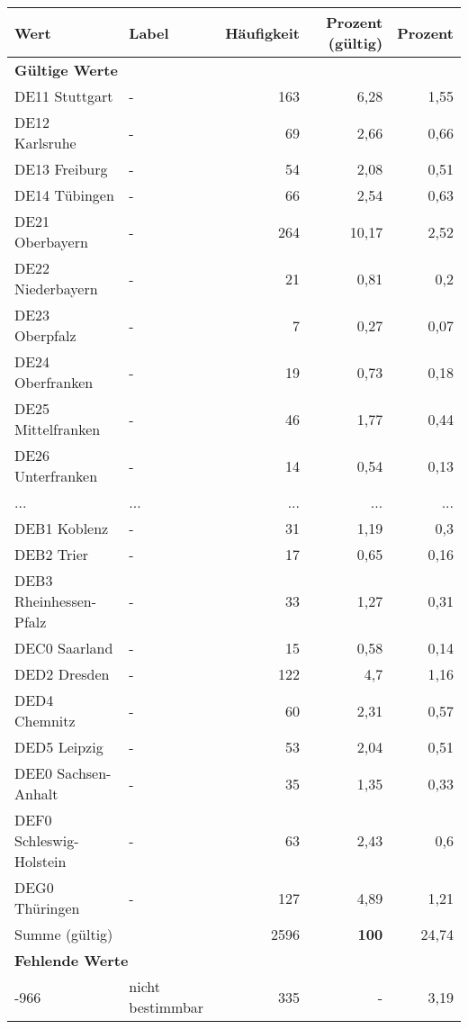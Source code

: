      \begin{longtable}{Xlrrr}
     \toprule
     \textbf{Wert} & \textbf{Label} & \textbf{Häufigkeit} & \textbf{Prozent (gültig)} & \textbf{Prozent} \\
     \endhead
     \midrule
     \multicolumn{5}{l}{\textbf{Gültige Werte}}\\
        \multicolumn{1}{X}{DE11 Stuttgart} & - & 163 & 6,28 & 1,55 \\
        \multicolumn{1}{X}{DE12 Karlsruhe} & - & 69 & 2,66 & 0,66 \\
        \multicolumn{1}{X}{DE13 Freiburg} & - & 54 & 2,08 & 0,51 \\
        \multicolumn{1}{X}{DE14 Tübingen} & - & 66 & 2,54 & 0,63 \\
        \multicolumn{1}{X}{DE21 Oberbayern} & - & 264 & 10,17 & 2,52 \\
        \multicolumn{1}{X}{DE22 Niederbayern} & - & 21 & 0,81 & 0,2 \\
        \multicolumn{1}{X}{DE23 Oberpfalz} & - & 7 & 0,27 & 0,07 \\
        \multicolumn{1}{X}{DE24 Oberfranken} & - & 19 & 0,73 & 0,18 \\
        \multicolumn{1}{X}{DE25 Mittelfranken} & - & 46 & 1,77 & 0,44 \\
        \multicolumn{1}{X}{DE26 Unterfranken} & - & 14 & 0,54 & 0,13 \\
       ... & ... & ... & ... & ... \\
        \multicolumn{1}{X}{DEB1 Koblenz} & - & 31 & 1,19 & 0,3 \\
        \multicolumn{1}{X}{DEB2 Trier} & - & 17 & 0,65 & 0,16 \\
        \multicolumn{1}{X}{DEB3 Rheinhessen-Pfalz} & - & 33 & 1,27 & 0,31 \\
        \multicolumn{1}{X}{DEC0 Saarland} & - & 15 & 0,58 & 0,14 \\
        \multicolumn{1}{X}{DED2 Dresden} & - & 122 & 4,7 & 1,16 \\
        \multicolumn{1}{X}{DED4 Chemnitz} & - & 60 & 2,31 & 0,57 \\
        \multicolumn{1}{X}{DED5 Leipzig} & - & 53 & 2,04 & 0,51 \\
        \multicolumn{1}{X}{DEE0 Sachsen-Anhalt} & - & 35 & 1,35 & 0,33 \\
        \multicolumn{1}{X}{DEF0 Schleswig-Holstein} & - & 63 & 2,43 & 0,6 \\
        \multicolumn{1}{X}{DEG0 Thüringen} & - & 127 & 4,89 & 1,21 \\
     \midrule
      \multicolumn{2}{l}{Summe (gültig)} & 2596 &
      \textbf{100} &
         24,74 \\
     \multicolumn{5}{l}{\textbf{Fehlende Werte}}\\
       -966 & nicht bestimmbar & 335 & - & 3,19 \\


\end{longtable}

